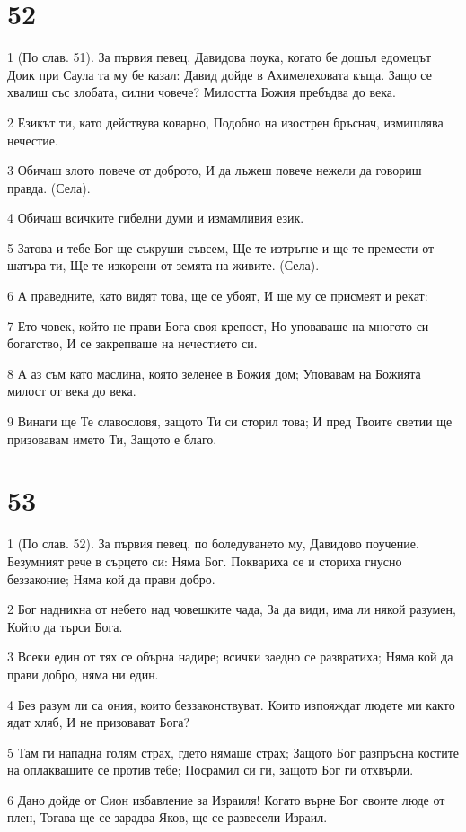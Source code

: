 \chapter{52}

\par 1 (По слав. 51). За първия певец, Давидова поука, когато бе дошъл едомецът Доик при Саула та му бе казал: Давид дойде в Ахимелеховата къща. Защо се хвалиш със злобата, силни човече? Милостта Божия пребъдва до века.
\par 2 Езикът ти, като действува коварно, Подобно на изострен бръснач, измишлява нечестие.
\par 3 Обичаш злото повече от доброто, И да лъжеш повече нежели да говориш правда. (Села).
\par 4 Обичаш всичките гибелни думи и измамливия език.
\par 5 Затова и тебе Бог ще съкруши съвсем, Ще те изтръгне и ще те премести от шатъра ти, Ще те изкорени от земята на живите. (Села).
\par 6 А праведните, като видят това, ще се убоят, И ще му се присмеят и рекат:
\par 7 Ето човек, който не прави Бога своя крепост, Но уповаваше на многото си богатство, И се закрепваше на нечестието си.
\par 8 А аз съм като маслина, която зеленее в Божия дом; Уповавам на Божията милост от века до века.
\par 9 Винаги ще Те славословя, защото Ти си сторил това; И пред Твоите светии ще призовавам името Ти, Защото е благо.

\chapter{53}

\par 1 (По слав. 52). За първия певец, по боледуването му, Давидово поучение. Безумният рече в сърцето си: Няма Бог. Поквариха се и сториха гнусно беззаконие; Няма кой да прави добро.
\par 2 Бог надникна от небето над човешките чада, За да види, има ли някой разумен, Който да търси Бога.
\par 3 Всеки един от тях се обърна надире; всички заедно се развратиха; Няма кой да прави добро, няма ни един.
\par 4 Без разум ли са ония, които беззаконствуват. Които изпояждат людете ми както ядат хляб, И не призовават Бога?
\par 5 Там ги нападна голям страх, гдето нямаше страх; Защото Бог разпръсна костите на оплакващите се против тебе; Посрамил си ги, защото Бог ги отхвърли.
\par 6 Дано дойде от Сион избавление за Израиля! Когато върне Бог своите люде от плен, Тогава ще се зарадва Яков, ще се развесели Израил.

